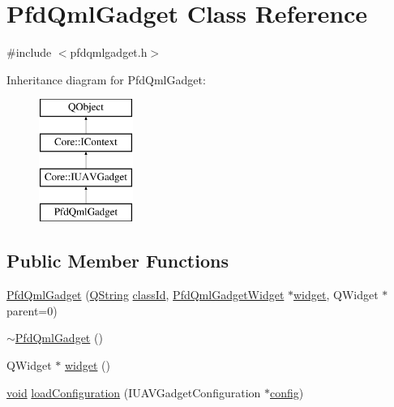 \hypertarget{class_pfd_qml_gadget}{\section{Pfd\-Qml\-Gadget Class Reference}
\label{class_pfd_qml_gadget}
}


{\ttfamily \#include $<$pfdqmlgadget.\-h$>$}

Inheritance diagram for Pfd\-Qml\-Gadget\-:\begin{figure}[H]
\begin{center}
\leavevmode
\includegraphics[height=4.000000cm]{class_pfd_qml_gadget}
\end{center}
\end{figure}
\subsection*{Public Member Functions}
\begin{DoxyCompactItemize}
\item 
\hyperlink{class_pfd_qml_gadget_a093efe6f5e7c6edecf82f807a2f2b432}{Pfd\-Qml\-Gadget} (\hyperlink{group___u_a_v_objects_plugin_gab9d252f49c333c94a72f97ce3105a32d}{Q\-String} \hyperlink{group___core_plugin_ga3878fde66a57220608960bcc3fbeef2c}{class\-Id}, \hyperlink{class_pfd_qml_gadget_widget}{Pfd\-Qml\-Gadget\-Widget} $\ast$\hyperlink{class_pfd_qml_gadget_a339cafbdd73def4a8f18db1e411ad6ac}{widget}, Q\-Widget $\ast$parent=0)
\item 
\hyperlink{class_pfd_qml_gadget_a14a791e928788f5aca7b2430062955b2}{$\sim$\-Pfd\-Qml\-Gadget} ()
\item 
Q\-Widget $\ast$ \hyperlink{class_pfd_qml_gadget_a339cafbdd73def4a8f18db1e411ad6ac}{widget} ()
\item 
\hyperlink{group___u_a_v_objects_plugin_ga444cf2ff3f0ecbe028adce838d373f5c}{void} \hyperlink{class_pfd_qml_gadget_a55e852fc54261c7a6fc488a327dd4783}{load\-Configuration} (I\-U\-A\-V\-Gadget\-Configuration $\ast$\hyperlink{deflate_8c_a4473b5227787415097004fd39f55185e}{config})
\end{DoxyCompactItemize}
